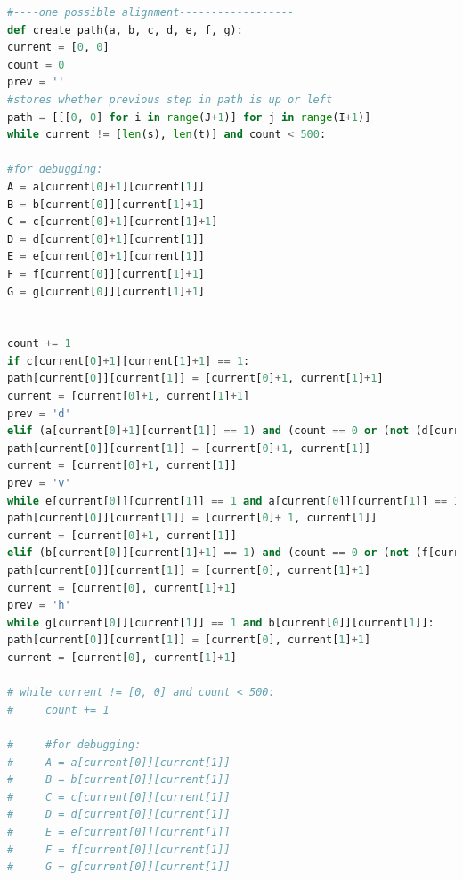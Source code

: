 \documentclass{article}
\begin{document}
\begin{lstlisting}[language=python]
#----one possible alignment------------------
def create_path(a, b, c, d, e, f, g):
current = [0, 0]
count = 0
prev = ''
#stores whether previous step in path is up or left
path = [[[0, 0] for i in range(J+1)] for j in range(I+1)]
while current != [len(s), len(t)] and count < 500:

#for debugging:
A = a[current[0]+1][current[1]]
B = b[current[0]][current[1]+1]
C = c[current[0]+1][current[1]+1]
D = d[current[0]+1][current[1]]
E = e[current[0]+1][current[1]]
F = f[current[0]][current[1]+1]
G = g[current[0]][current[1]+1]


count += 1
if c[current[0]+1][current[1]+1] == 1:
path[current[0]][current[1]] = [current[0]+1, current[1]+1]
current = [current[0]+1, current[1]+1]
prev = 'd'
elif (a[current[0]+1][current[1]] == 1) and (count == 0 or (not (d[current[0]+1][current[1]] == 0 and  prev == 'v')and not (d[current[0]+1][current[1]] == 1 and  prev != 'v'))):
path[current[0]][current[1]] = [current[0]+1, current[1]]
current = [current[0]+1, current[1]]
prev = 'v'
while e[current[0]][current[1]] == 1 and a[current[0]][current[1]] == 1:
path[current[0]][current[1]] = [current[0]+ 1, current[1]]
current = [current[0]+1, current[1]]
elif (b[current[0]][current[1]+1] == 1) and (count == 0 or (not (f[current[0]][current[1]+1] == 0 and  prev == 'h')and not (f[current[0]][current[1]+1] == 1 and  prev != 'h'))):
path[current[0]][current[1]] = [current[0], current[1]+1]
current = [current[0], current[1]+1]
prev = 'h'
while g[current[0]][current[1]] == 1 and b[current[0]][current[1]]:
path[current[0]][current[1]] = [current[0], current[1]+1]
current = [current[0], current[1]+1]

# while current != [0, 0] and count < 500:
#     count += 1

#     #for debugging:
#     A = a[current[0]][current[1]]
#     B = b[current[0]][current[1]]
#     C = c[current[0]][current[1]]
#     D = d[current[0]][current[1]]
#     E = e[current[0]][current[1]]
#     F = f[current[0]][current[1]]
#     G = g[current[0]][current[1]]


\end{lstlisting}
\end{document}
